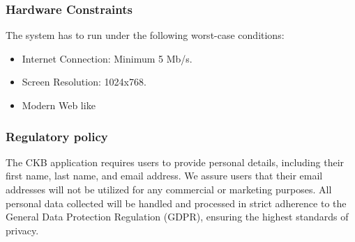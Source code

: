 \subsubsection{Hardware Constraints}
The system has to run under the following worst-case conditions:
\begin{itemize}
    \item Internet Connection: Minimum 5 Mb/s.
    \item Screen Resolution: 1024x768.
    \item Modern Web like
\end{itemize}

\subsubsection{Regulatory policy}
The CKB application requires users to provide personal details, including their first name, last name, and email address. We assure users that their email addresses will not be utilized for any commercial or marketing purposes. All personal data collected will be handled and processed in strict adherence to the General Data Protection Regulation (GDPR), ensuring the highest standards of privacy.

